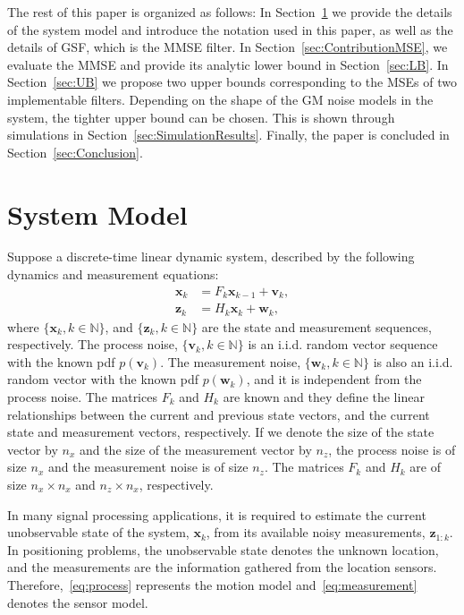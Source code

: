\documentclass[10pt,twocolumn,twoside]{IEEEtran}
\newcommand{\corcol}[1]{\textcolor{CorCol}{#1}}
\begin{document}
The rest of this paper is organized as follows: In Section~\ref{sec:Notations} we provide the details of the system model and introduce the notation used in this paper, as well as the details of GSF, which is the MMSE filter. In Section~\ref{sec:ContributionMSE}, we evaluate the MMSE and provide its analytic lower bound in Section~\ref{sec:LB}. In Section~\ref{sec:UB} we propose two upper bounds corresponding to the MSEs of two implementable filters. Depending on the shape of the GM noise models in the system, the tighter upper bound can be chosen. This is shown through simulations in Section~\ref{sec:SimulationResults}. Finally, the paper is concluded in Section~\ref{sec:Conclusion}. 

\section{System Model}
\label{sec:Notations}
Suppose a discrete-time linear dynamic system, described by the following dynamics and measurement equations:
\begin{align}
\label{eq:process}
\mathbf{x}_{k} & = F_{k}\mathbf{x}_{k-1}+\mathbf{v}_{k},\\
\label{eq:measurement}
\mathbf{z}_k & = H_k\mathbf{x}_{k} + \mathbf{w}_k,
\end{align}
where \(\{\mathbf{x}_{k},k \in  \mathbb{N}\}\), and \(\{\mathbf{z}_{k},k \in  \mathbb{N}\}\) are the state and measurement sequences, respectively. The process noise, \(\{\mathbf{v}_{k},k \in  \mathbb{N}\}\) is an i.i.d. random vector sequence with the known pdf \(p{ \left(\mathbf{v}_{k} \right)}\).   The measurement noise, \(\{\mathbf{w}_{k},k \in  \mathbb{N}\}\) is also an i.i.d. random vector with the known pdf \(p{\left( \mathbf{w}_{k} \right)}\), and it is independent from the process noise. The matrices \(F_k\) and \(H_k\) are known and they define the linear relationships between the current and previous state vectors, and the current state and measurement vectors, respectively. \corcol{If we denote the size of the state vector by \(n_x\) and the size of the measurement vector by \(n_z\), the process noise is of size \(n_x\) and the measurement noise is of size \(n_z\). The matrices \(F_k\) and \(H_k\) are of size \(n_x \times n_x\) and \(n_z \times n_x\), respectively.}

In many signal processing applications, it is required to estimate the current unobservable state of the system, \(\mathbf{x}_k\), from its available noisy measurements, \(\mathbf{z}_{1:k}\). In positioning problems, the unobservable state denotes the unknown location, and the measurements are the information gathered from the location sensors. Therefore,~\eqref{eq:process} represents the motion model and~\eqref{eq:measurement} denotes the sensor model.
\end{document}

